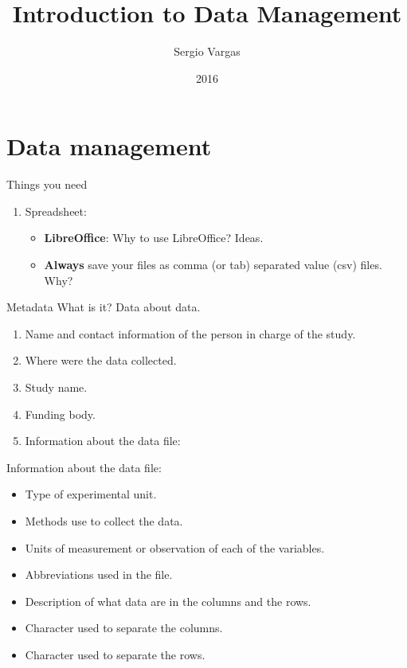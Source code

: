 \documentclass{beamer}
\title[Geostatistics]{Introduction to Data Management}
\author{Sergio Vargas}
\institute{Dept. Earth \& Environmental Sciences, LMU M\"unchen}
\date{2016}
\begin{document}
\begin{frame}
  \titlepage
\end{frame}


\section{Data management}

\begin{frame}{Things you need}
\begin{enumerate}
  \item Spreadsheet:
    \begin{itemize}
      \item \textbf{LibreOffice}: Why to use LibreOffice? Ideas.
      \pause
      \item \textbf{Always} save your files as comma (or tab) separated value (csv) files. Why?
    \end{itemize}
\end{enumerate}
\end{frame}


\begin{frame}{Metadata}
  What is it?
  \pause
  Data about data.
  \begin{enumerate}
    \item Name and contact information of the person in charge of the study.
    \item Where were the data collected.
    \item Study name.
    \item Funding body.
    \item Information about the data file:
  \end{enumerate}
\end{frame}


\begin{frame}{Information about the data file:}
  \begin{itemize}
    \item Type of experimental unit.
    \item Methods use to collect the data.
    \item Units of measurement or observation of each of the variables.
    \item Abbreviations used in the file.
    \item Description of what data are in the columns and the rows.
    \item Character used to separate the columns.
    \item Character used to separate the rows.
  \end{itemize}
\end{frame}
\end{document}
